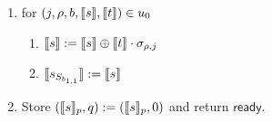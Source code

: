 \begin{figure}[H]
{\begin{minipage}{.95\textwidth}
\begin{enumerate}
\begin{enumerate}
\begin{enumerate}
                \item $\share{s'}_p := \mathsf{G}(\share{s}_p)$ 
                \item $\share{z_d}:=\share{z_d}\oplus\share{s'}$
                \item $\share{v_d}:=\share{v_d}\oplus\lsb(\share{s})$
                \item for $k\in \{1,2\}$
                \begin{enumerate}
                    \item $(\delta,b'):=\partition(b_k)$
                    \item $u_{\delta}:=\append(u_{\delta},(k,d,b',\share{s_k'},\lsb(\share{s})))$
                \end{enumerate}
            \end{enumerate}
            \item $\share r\gets\{0,1\}^{2\times\kappa}$
            \item $\share{z_d}:=\share{z_d}\oplus(1\oplus\share{v_d})\cdot\share r$
            \item $\sigma_d:=\correctionWord(\share{z_d},\share{\alpha_d})$
        \end{enumerate}
        \item for $(j,\rho,b,\share{s},\share{t})\in u_0$
        \begin{enumerate}
            \item $\share{s}:=\share{s} \oplus\share{t} \cdot \sigma_{\rho,j}$             
            \item $\share{s_{S_{b_{1,1}}}}:=\share{s}$
        \end{enumerate}
        
        \item Store $(\share s_p,q):=(\share s_p,0)$ and return $\mathsf{ready}$.
    \end{enumerate}


\end{minipage}}
\end{figure}
